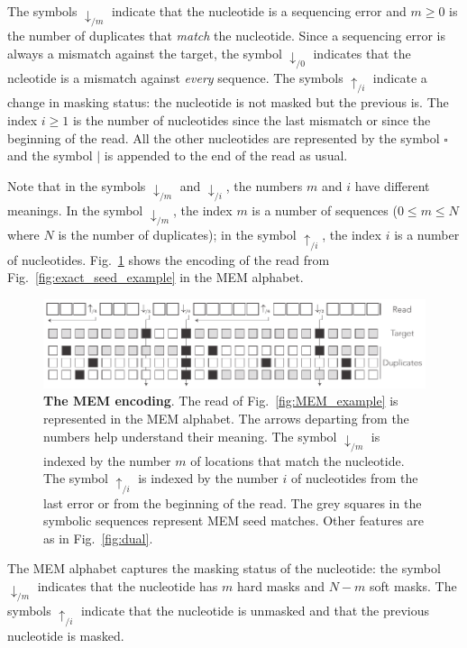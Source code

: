 \documentclass{article}
\begin{document}
The symbols $\downarrow_{/m}$ indicate that the nucleotide is a sequencing
error and $m \geq 0$ is the number of duplicates that \emph{match} the
nucleotide. Since a sequencing error is always a mismatch against the
target, the symbol $\downarrow_{/0}$ indicates that the ncleotide is a
mismatch against \emph{every} sequence. The symbols $\uparrow_{/i}$
indicate a change in masking status: the nucleotide is not masked but the
previous is. The index $i \geq 1$ is the number of nucleotides since the
last mismatch or since the beginning of the read. All the other
nucleotides are represented by the symbol $\square$ and the symbol $|$ is
appended to the end of the read as usual.

Note that in the symbols $\downarrow_{/m}$ and $\downarrow_{/i}$, the
numbers $m$ and $i$ have different meanings. In the symbol
$\downarrow_{/m}$, the index $m$ is a number of sequences ($0 \leq m \leq
N$ where $N$ is the number of duplicates); in the symbol $\uparrow_{/i}$,
the index $i$ is a number of nucleotides. Fig.~\ref{fig:sketch_extended}
shows the encoding of the read from Fig.~\ref{fig:exact_seed_example} in
the MEM alphabet.

\begin{figure}[h]
\centering
\includegraphics[scale=.84]{sketch_extended.pdf}
\caption{\textbf{The MEM encoding}.
The read of Fig.~\ref{fig:MEM_example} is represented in the MEM alphabet.
The arrows departing from the numbers help understand their meaning. The
symbol $\downarrow_{/m}$ is indexed by the number $m$ of locations that
match the nucleotide. The symbol $\uparrow_{/i}$ is indexed by the number
$i$ of nucleotides from the last error or from the beginning of the read.
The grey squares in the symbolic sequences represent MEM seed matches.
Other features are as in Fig.~\ref{fig:dual}.}
\label{fig:sketch_extended}
\end{figure}

The MEM alphabet captures the masking status of the nucleotide: the symbol
$\downarrow_{/m}$ indicates that the nucleotide has $m$ hard masks and
$N-m$ soft masks. The symbols $\uparrow_{/i}$ indicate that the nucleotide
is unmasked and that the previous nucleotide is masked.
\end{document}
